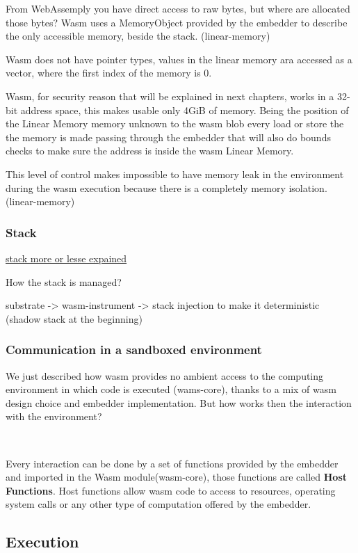 \documentclass[../main.tex]{subfiles}
\begin{document}
From WebAssemply you have direct access to raw bytes, but where are allocated those bytes? Wasm uses a MemoryObject provided by the embedder to describe the only accessible memory, beside the stack. (linear-memory)

Wasm does not have pointer types, values in the linear memory ara accessed as a vector, where the first index of the memory is 0.

Wasm, for security reason that will be explained in next chapters, works in a 32-bit address space, this makes usable only 4GiB of memory. Being the position of the Linear Memory memory unknown to the wasm blob every load or store the the memory is made passing through the embedder that will also do bounds checks to make sure the address is inside the wasm Linear Memory.

This level of control makes impossible to have memory leak in the environment during the wasm execution because there is a completely memory isolation. (linear-memory)

\subsubsection{Stack}
\href{https://hackmd.io/@pepyakin/SkmPKGhiq}{stack more or lesse expained}

How the stack is managed?

substrate -> wasm-instrument -> stack injection to make it deterministic (shadow stack at the beginning)

\subsubsection{Communication in a sandboxed environment}

We just described how wasm provides no ambient access to the computing environment in which code is executed (wams-core), thanks to a mix of wasm design choice and embedder implementation. But how works then the interaction with the environment?

\

Every interaction can be done by a set of functions provided by the embedder and imported in the Wasm module(wasm-core), those functions are called \textbf{Host Functions}. Host functions allow wasm code to access to resources, operating system calls or any other type of computation offered by the embedder.

\subsection{Execution}
\end{document}
